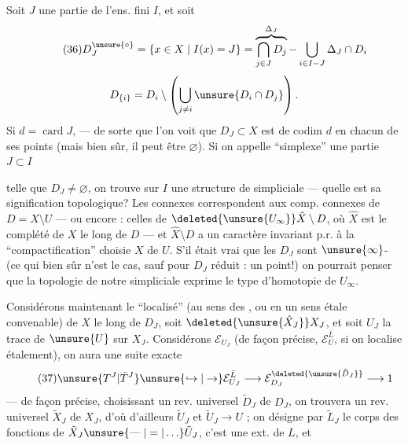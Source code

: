 
Soit $J$ une partie de l'ens. fini $I$, et soit
\[
\tag{36}
D_J^{\unsure{\circ}}=\{x\in X\mid I(x)=J\}
=\overbrace{\bigcap_{j\in J}D_j}^{\Delta_J}-\bigcup_{i\in I-J}\Delta_J\cap D_i
\]
\[
D_{\{i\}}=D_i\setminus\left(\bigcup_{j\ne i}\unsure{D_i\cap D_j}\right).
\]
Si $d=\operatorname{card}J$, --- de sorte que l'on voit que $D_J\subset X$ est  de codim $d$ en chacun de ses points (mais bien sûr, il peut être $\varnothing$). Si on appelle ``simplexe'' une partie $J\subset I$



telle que $D_J\ne\varnothing$,  on trouve sur $I$ une structure de   simpliciale --- quelle est sa signification topologique? Les  connexes correspondent aux comp. connexes de $D=X\setminus U$ --- ou encore : celles de $\deleted{\unsure{U_\infty}}\hat X\setminus D$, où $\hat X$ est le  complété de $X$ le long de $D$ --- et $\hat X\setminus D$ a un caractère invariant p.r. à la ``compactification'' choisie $X$ de $U$. S'il était vrai que les $D_J$  sont $\unsure{\infty}$- (ce qui bien sûr n'est \uline{} le cas, sauf pour $D_J$ réduit : un point!) on pourrait penser que la topologie de notre   simpliciale exprime le type d'homotopie de $U_\infty$.

Considérons maintenant le ``localisé''  (au sens des , ou en un sens étale convenable) de $X$ le long de $D_J$, soit $\deleted{\unsure{\hat X_J}}X_J$, et soit $U_J$  la trace de $\unsure{U}$ sur $X_J$. Considérons $\mathcal E_{U_J}$ (de façon précise, $\mathcal E_U^{\bar L}$, si on localise  étalement), on aura une suite exacte
\[
\tag{37}
\unsure{T^J|\bar T^J}\unsure{\hookrightarrow|\to}\mathcal E_{U_J}^{\bar L}\longrightarrow\mathcal E_{D_J}^{\deleted{\unsure{\tilde D_J}}}\longrightarrow1
\]
--- de façon précise, choisissant un rev. universel $\tilde D_J$ de $D_J$, on trouvera un rev. universel  $\tilde X_J$ de $X_J$, d'où d'ailleurs $\tilde U_J$ et $\tilde U_J\longrightarrow U$ ;  on désigne par $\tilde L_J$ le corps des fonctions de $\tilde X_J\unsure{\mathrel{\text{---}}|=|\ldots}\tilde U_J$, c'est une ext.  de $L$, et


